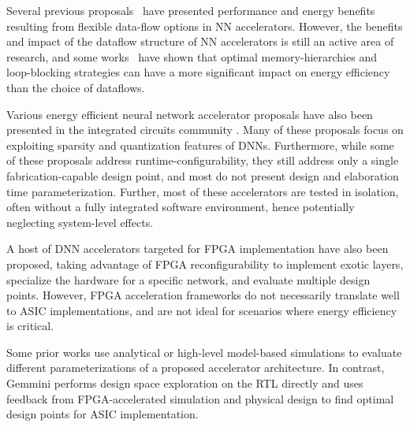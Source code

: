 Several previous proposals~\cite{squeeze, lu2017flexflow, fu2017} have presented performance and energy benefits resulting from flexible data-flow options in NN accelerators. However, the benefits and impact of the dataflow structure of NN accelerators is still an active area of research, and some works~\cite{overrrated} have shown that optimal memory-hierarchies and loop-blocking strategies can have a more significant impact on energy efficiency than the choice of dataflows. 

Various energy efficient neural network accelerator proposals have also been presented in the integrated circuits community \cite{ueyoshi2018quest, lee2018unpu, bankman2018always, karnik2018cm, shin201714, yin20171, ando2017brein, kim20192, sayal201914, lee20197, yue20197}. Many of these proposals focus on exploiting sparsity and quantization features of DNNs. Furthermore, while some of these proposals address runtime-configurability, they still address only a single fabrication-capable design point, and most do not present design and elaboration time parameterization. Further, most of these accelerators are tested in isolation, often without a fully integrated software environment, hence potentially neglecting system-level effects. 

A host of DNN accelerators targeted for FPGA implementation have also been proposed\cite{zeng2018, wang2016, shen2018, dicecco2016, guan2017, guo2018, zhang2018, zhang2015, venieris2016, sharma2016, zhang2017, wang2017}, taking advantage of FPGA reconfigurability to implement exotic layers, specialize the hardware for a specific network, and evaluate multiple design points. However, FPGA acceleration frameworks do not necessarily translate well to ASIC implementations, and are not ideal for scenarios where energy efficiency is critical.

Some prior works \cite{yazdani2016,song2017,srivastava2018,sharify2018,squeeze,angizi2018,min2019,nowatzki2017} use analytical or high-level model-based simulations to evaluate different parameterizations of a proposed accelerator architecture. 
In contrast, Gemmini performs design space exploration on the RTL directly and uses feedback from FPGA-accelerated simulation and physical design to find optimal design points for ASIC implementation.

